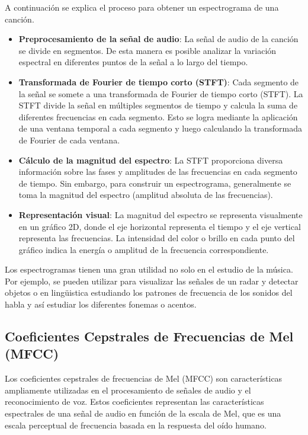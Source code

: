 A continuación se explica el proceso para obtener un espectrograma de una canción.

\begin{itemize}
\tightlist
\item \textbf{Preprocesamiento de la señal de audio}: La señal de audio de la canción se divide en segmentos. De esta manera es posible analizar la variación espectral en diferentes puntos de la señal a lo largo del tiempo.

\item \textbf{Transformada de Fourier de tiempo corto (STFT)}: Cada segmento de la señal se somete a una transformada de Fourier de tiempo corto (STFT). La STFT divide la señal en múltiples segmentos de tiempo y calcula la suma de diferentes frecuencias en cada segmento. 
Esto se logra mediante la aplicación de una ventana temporal a cada segmento y luego calculando la transformada de Fourier de cada ventana.

\item \textbf{Cálculo de la magnitud del espectro}: La STFT proporciona diversa información sobre las fases y amplitudes de las frecuencias en cada segmento de tiempo. Sin embargo, para construir un espectrograma, generalmente se toma la magnitud del espectro (amplitud absoluta de las frecuencias).

\item \textbf{Representación visual}: La magnitud del espectro se representa visualmente en un gráfico 2D, donde el eje horizontal representa el tiempo y el eje vertical representa las frecuencias. La intensidad del color o brillo en cada punto del gráfico indica la energía o amplitud de la frecuencia correspondiente.
\end{itemize}

Los espectrogramas tienen una gran utilidad no solo en el estudio de la música. Por ejemplo, se pueden utilizar para visualizar las señales de un radar y detectar objetos o en lingüistica estudiando los patrones de frecuencia de los sonidos del habla y así estudiar los diferentes fonemas o acentos.


\newpage

\subsection{Coeﬁcientes Cepstrales de Frecuencias de Mel (MFCC)}
Los coeficientes cepstrales de frecuencias de Mel (MFCC) son características ampliamente utilizadas en el procesamiento de señales de audio y el reconocimiento de voz. 
Estos coeficientes representan las características espectrales de una señal de audio en función de la escala de Mel, que es una escala perceptual de frecuencia basada en la respuesta del oído humano.

